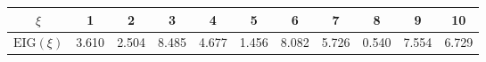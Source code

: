 \begin{tabular}{|c|c|c|c|c|c|c|c|c|c|c|}
\hline
$\xi$ & 1 & 2 & \cellcolor{cyellow}3 & 4 & 5 & 6 & 7 & 8 & 9 & 10 \\
\hline
$\mathrm{EIG}(\xi)$ & 3.610 & 2.504 & \cellcolor{cyellow}8.485 & 4.677 & 1.456 & 8.082 & 5.726 & 0.540 & 7.554 & 6.729 \\
\hline
\end{tabular}